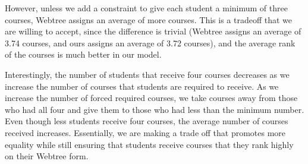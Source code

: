 However, unless we add a constraint to give each student a minimum of
three courses, Webtree assigns an average of more courses. This is a
tradeoff that we are willing to accept, since the difference is
trivial (Webtree assigns an average of 3.74 courses, and ours assigns
an average of 3.72 courses), and the average rank of the courses is
much better in our model. 

Interestingly, the number of students that receive four courses
decreases as we increase the number of courses that students are
required to receive. As we increase the number of forced required
courses, we take courses away from those who had all four and give
them to those who had less than the minimum number. Even though less
students receive four courses, the average number of courses received
increases. Essentially, we are making a trade off that promotes more
equality while still ensuring that students receive courses that they
rank highly on their Webtree form. 











